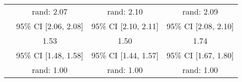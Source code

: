 \documentclass{article}
\begin{document}
\begin{longtable}{lccc}
                                        &              rand: 2.07 &              rand: 2.10 &              rand: 2.09 \\
                                        &    95\% CI [2.06, 2.08] &    95\% CI [2.10, 2.11] &    95\% CI [2.08, 2.10] \\
\rule{0pt}{4ex} \multirow{3}{*}{\textbf{Small World}}   &                    1.53 &                    1.50 &                    1.74 \\
                                        &    95\% CI [1.48, 1.58] &    95\% CI [1.44, 1.57] &    95\% CI [1.67, 1.80] \\
                                        &              rand: 1.00 &              rand: 1.00 &              rand: 1.00 \\
\end{longtable}
\end{document}
